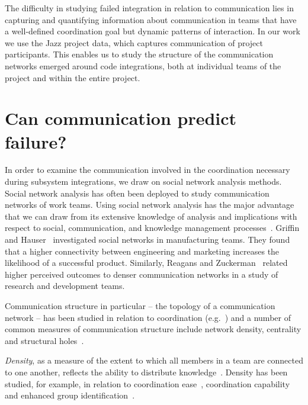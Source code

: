 \documentclass[12pt,oneside]{book}
\begin{document}
The difficulty in studying failed integration in relation to communication lies
in capturing and quantifying information about communication in teams that have a
well-defined coordination goal but dynamic patterns of interaction. In our work
we use the Jazz project data, which captures communication of project
participants. This enables us to study the structure of the communication
networks emerged around code integrations, both at individual teams of the
project and within the entire project.



\section{Can communication predict failure?}
\label{sec:ResearchQuestions}
In order to examine the communication involved in the coordination necessary
during subsystem integrations, we draw on social network analysis methods. Social
network analysis has often been deployed to study communication networks of work
teams. Using social network analysis has the major advantage that we can draw
from its extensive knowledge of analysis and implications with respect to social,
communication, and knowledge management
processes~\cite{Burt:1995vo,Freeman:1979rl}. Griffin and
Hauser~\cite{Griffin:1992ms} investigated social networks in manufacturing teams.
They found that a higher connectivity between engineering and marketing increases
the likelihood of a successful product. Similarly, Reagans and
Zuckerman~\cite{RayReagans:2001os} related higher perceived outcomes to denser
communication networks in a study of research and development teams.

Communication structure in particular -- the topology of a communication network
-- has been studied in relation to coordination
(e.g.~\cite{hossain:cscw:2006,hinds:cscw:2006}) and a number of common measures of
communication structure include network density, centrality and structural
holes~\cite{Wasserman:1994sq,Freeman:1979rl}.


\emph{Density}, as a measure of the extent to which all members in a team are
connected to one another, reflects the ability to distribute
knowledge~\cite{Rulke:2000ys}. Density has been studied, for example, in relation
to coordination ease~\cite{hinds:cscw:2006}, coordination
capability~\cite{hossain:cscw:2006} and enhanced group
identification~\cite{RayReagans:2001os}.
\end{document}
